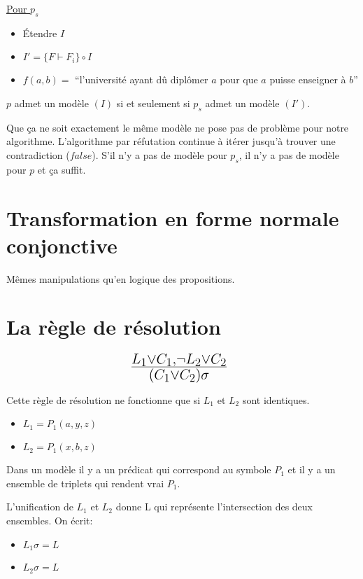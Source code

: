 \vspace{5 mm}

\underline{Pour $p_s$}
\begin{itemize}
  \item Étendre $I$
  \item $I' = \big\{ F \vdash F_i \big\} \circ I$
  \item $f(a,b) = $ ``l'université ayant dû diplômer $a$ pour que $a$ puisse enseigner à $b$''
\end{itemize}

\vspace{5 mm}
$p$ admet un modèle $(I)$ si et seulement si $p_s$ admet un modèle $(I')$.

Que ça ne soit exactement le même modèle ne pose pas de problème pour notre algorithme. L'algorithme par réfutation continue à itérer jusqu'à trouver une contradiction ($false$). S'il n'y a pas de modèle pour $p_s$, il n'y a pas de modèle pour $p$ et ça suffit.

\section{Transformation en forme normale conjonctive}

Mêmes manipulations qu'en logique des propositions.

\section{La règle de résolution}

$$ \mbox{\huge $\frac{L_1 \vee C_1, \neg L_2 \vee C_2}{(C_1 \vee C_2)\sigma}$ } $$

Cette règle de résolution ne fonctionne que si $L_1$ et $L_2$ sont identiques.

\begin{itemize}
  \item $L_1 = P_1(a, y, z)$
  \item $L_2 = P_1(x, b, z)$
\end{itemize}

Dans un modèle il y a un prédicat qui correspond au symbole $P_1$ et il y a un ensemble de triplets qui rendent vrai $P_1$.

L'unification de $L_1$ et $L_2$ donne L qui représente l'intersection des deux ensembles. On écrit:
\begin{itemize}
  \item $L_1 \sigma = L$
  \item $L_2 \sigma = L$
\end{itemize}

